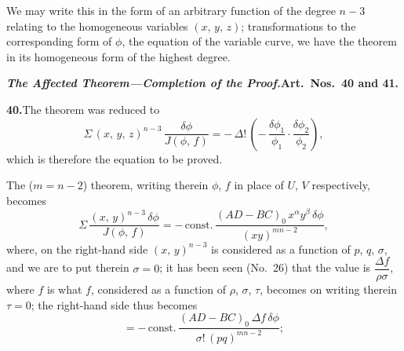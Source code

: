 \documentclass[11pt,a4paper]{article}
\theoremstyle{plain}
\theoremstyle{definition}
\theoremstyle{remark}
\begin{document}
We may write this in the form of an arbitrary function of the degree $n - 3$ relating to the homogeneous variables $(x,\,y,\,z)$; transformations to the corresponding form of $\phi$, the equation of the variable curve, we have the theorem in its homogeneous form of the highest degree.

\medskip\noindent\textbf{\textit{The Affected Theorem---Completion of the Proof.}\quad Art.\ Nos.\ 40 and 41.}

\medskip\noindent\textbf{40.}\quad The theorem was reduced to
\[
\Sigma\,(x,\,y,\,z)^{n-3}\,\frac{\delta\phi}{J(\phi,\,f)} = -\,\Delta!\,\left(-\,\frac{\delta\phi_1}{\phi_1}\cdot\frac{\delta\phi_2}{\phi_2}\right),
\]
which is therefore the equation to be proved.

The ($m = n - 2$) theorem, writing therein $\phi$, $f$ in place of $U$, $V$ respectively, becomes
\[
\Sigma\,\frac{(x,\,y)^{n-3}\,\delta\phi}{J(\phi,\,f)} = -\,\text{const.}\,\frac{(AD - BC)_0\,x^\alpha y^\beta\,\delta\phi}{(xy)^{mn-2}},
\]
where, on the right-hand side $(x,\,y)^{n-3}$ is considered as a function of $p$, $q$, $\sigma$, and we are to put therein $\sigma = 0$; it has been seen (No.\ 26) that the value is $\dfrac{\Delta f}{\rho\sigma}$, where $f$ is what $f$, considered as a function of $\rho$, $\sigma$, $\tau$, becomes on writing therein $\tau = 0$; the right-hand side thus becomes
\[
= -\,\text{const.}\,\frac{(AD - BC)_0\,\Delta f\,\delta\phi}{\sigma!\,(pq)^{mn-2}};
\]
\end{document}
